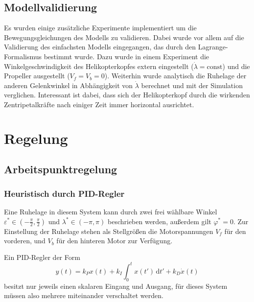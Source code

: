 \documentclass[10pt,twocolumn]{article}
\begin{document}
	\subsection{Modellvalidierung}
	
	Es wurden einige zusätzliche Experimente implementiert um die Bewegungsgleichungen des Modells zu validieren. Dabei wurde vor allem auf die Validierung des einfachsten Modells eingegangen, das durch den Lagrange-Formalismus bestimmt wurde.
	Dazu wurde in einem Experiment die Winkelgeschwindigkeit des Helikopterkopfes extern eingestellt ($\dot{\lambda} = \mathrm{const}$) und die Propeller ausgestellt ($V_f = V_b = 0$).
	Weiterhin wurde analytisch die Ruhelage der anderen Gelenkwinkel in Abhängigkeit von $\dot{\lambda}$ berechnet und mit der Simulation verglichen.
	Interessant ist dabei, dass sich der Helikopterkopf durch die wirkenden Zentripetalkräfte nach einiger Zeit immer horizontal ausrichtet.
	
	\section{Regelung}
	\subsection{Arbeitspunktregelung}
	\subsubsection{Heuristisch durch PID-Regler}
	Eine Ruhelage in diesem System kann durch zwei frei wählbare Winkel \(\varepsilon^* \in (-\frac{\pi}{2}, \frac{\pi}{2})\) und \(\lambda^* \in (-\pi, \pi)\) beschrieben werden, außerdem gilt \(\varphi^*=0\).
	Zur Einstellung der Ruhelage stehen als Stellgrößen die Motorspannungen \(V_f\) für den vorderen, und \(V_b\) für den hinteren Motor zur Verfügung.
	
	Ein PID-Regler der Form
	\[
	y(t) = k_P x(t) + k_I \int_0^t x(t') \, \mathrm{d}t' +  k_D \dot{x}(t)
	\]
	besitzt nur jeweils einen skalaren Eingang und Ausgang, für dieses System müssen also mehrere miteinander verschaltet werden.
	
\end{document}
